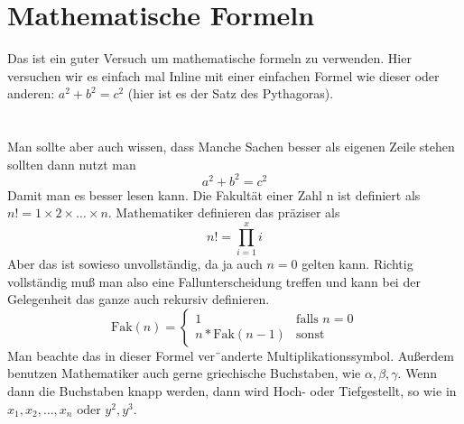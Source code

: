 \documentclass[a4paper,11pt]{article}
\begin{document}
\section{Mathematische Formeln}

Das ist ein guter Versuch um mathematische formeln zu verwenden. 
Hier versuchen wir es einfach mal Inline mit einer einfachen Formel wie dieser 
oder anderen: \begin{math}  a^{2} + b^{2} = c^{2}\end{math} (hier ist es der Satz des Pythagoras). \\
\\
\\

Man sollte aber auch wissen, dass Manche Sachen besser als eigenen Zeile stehen sollten dann nutzt man 
\begin{displaymath}
 a^{2} + b^{2} = c^{2}
\end{displaymath}
Damit man es besser lesen kann. 
Die Fakultät einer Zahl n ist definiert als \begin{math}n! = 1 \times 2 \times \ldots \times n.\end{math} Mathematiker definieren
das präziser als
\begin{displaymath}
n! =  \prod_{i = 1}^{x}{i}
\end{displaymath}
Aber das ist sowieso unvollständig, da ja auch $n = 0$ gelten kann. Richtig vollständig
muß man also eine Fallunterscheidung treffen und kann bei der Gelegenheit das ganze
auch rekursiv definieren.
\begin{displaymath}
\text{Fak}(n) = 
\begin{cases}
1  &  \text{falls } n = 0  \\
n * \text{Fak}(n - 1)  &  \text{sonst} 
\end{cases}
\end{displaymath}
Man beachte das in dieser Formel ver¨anderte Multiplikationssymbol. Außerdem benutzen
Mathematiker auch gerne griechische Buchstaben, wie $\alpha, \beta, \gamma$. Wenn dann die Buchstaben
knapp werden, dann wird Hoch- oder Tiefgestellt, so wie in $x_{1}, x_{2}, \ldots , x_{n} \text{ oder } y^{2}, y^{3}.$
\end{document}
